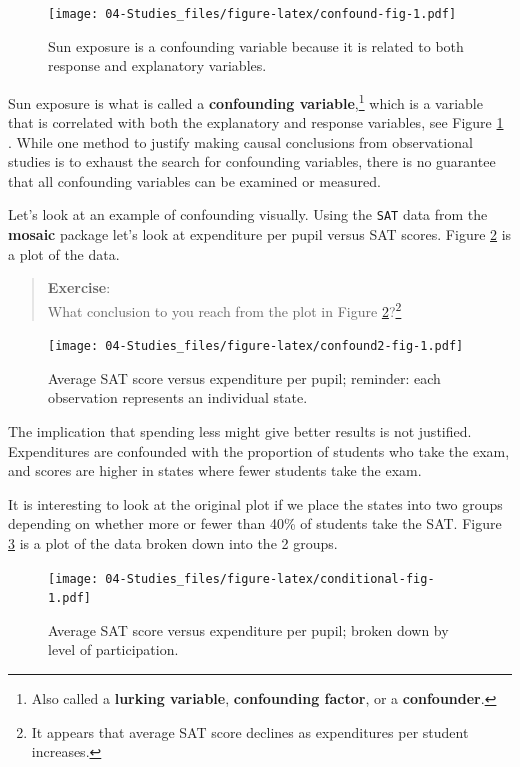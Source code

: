 \documentclass[
]{book}
\begin{document}
\begin{figure}
\centering
\texttt{[image: 04-Studies\_files/figure-latex/confound-fig-1.pdf]}
\caption{\label{fig:confound-fig}Sun exposure is a confounding variable because it is related to both response and explanatory variables.}
\end{figure}

Sun exposure is what is called a \textbf{confounding variable},\footnote{Also called a \textbf{lurking variable}, \textbf{confounding factor}, or a \textbf{confounder}.} which is a variable that is correlated with both the explanatory and response variables, see Figure \ref{fig:confound-fig} . While one method to justify making causal conclusions from observational studies is to exhaust the search for confounding variables, there is no guarantee that all confounding variables can be examined or measured.

Let's look at an example of confounding visually. Using the \texttt{SAT} data from the \textbf{mosaic} package let's look at expenditure per pupil versus SAT scores. Figure \ref{fig:confound2-fig} is a plot of the data.

\begin{quote}
\textbf{Exercise}:\\
What conclusion to you reach from the plot in Figure \ref{fig:confound2-fig}?\footnote{It appears that average SAT score declines as expenditures per student increases.}
\end{quote}

\begin{figure}
\centering
\texttt{[image: 04-Studies\_files/figure-latex/confound2-fig-1.pdf]}
\caption{\label{fig:confound2-fig}Average SAT score versus expenditure per pupil; reminder: each observation represents an individual state.}
\end{figure}

The implication that spending less might give better results is not justified. Expenditures are confounded with the proportion of students who take the exam, and scores are higher in states where fewer students take the exam.

It is interesting to look at the original plot if we place the states into two groups depending on whether more or
fewer than 40\% of students take the SAT. Figure \ref{fig:conditional-fig} is a plot of the data broken down into the 2 groups.

\begin{figure}
\centering
\texttt{[image: 04-Studies\_files/figure-latex/conditional-fig-1.pdf]}
\caption{\label{fig:conditional-fig}Average SAT score versus expenditure per pupil; broken down by level of participation.}
\end{figure}
\end{document}

